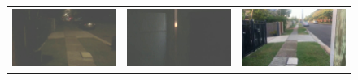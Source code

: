\documentclass[letterpaper, 10 pt, conference]{ieeeconf}  %
\begin{document}
\begin{figure}[htbp]
\begin{tabular}{ccc}
 \includegraphics[width=\imgW,height=\imgH]{rio-q1-2} &
 \includegraphics[width=\imgW,height=\imgH]{rio-rf1-2} &
 \includegraphics[width=\imgW,height=\imgH]{rio-r1} \\
 

\end{tabular}
\end{figure}
\end{document}

